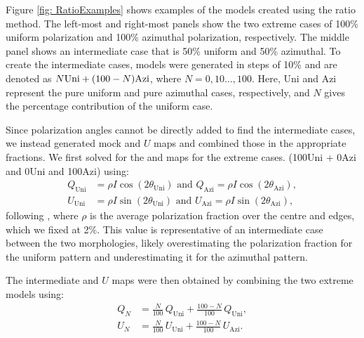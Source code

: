 Figure \ref{fig: RatioExamples} shows examples of the models created using the ratio method.  The left-most and right-most panels show the two extreme cases of 100\% uniform polarization and 100\% azimuthal polarization, respectively.  The middle panel shows an intermediate case that is 50\% uniform and 50\% azimuthal.  To create the intermediate cases, models were generated in steps of 10\% and are denoted as $N \text{Uni} + (100 - N) \text{Azi}$, where $N = 0, 10 \ldots, 100$. Here, Uni and Azi represent the pure uniform and pure azimuthal cases, respectively, and $N$ gives the percentage contribution of the uniform case. 





Since polarization angles cannot be directly added to find the intermediate cases, we instead generated mock \SQ and $U$ maps and combined those in the appropriate fractions.  We first solved for the \SQ and \SQ maps for the extreme cases. (100Uni + 0Azi and 0Uni and 100Azi) using:
\begin{equation}
\begin{aligned}
Q_{\text{Uni}} &= \rho I \cos(2\theta_{\text{Uni}}) \text{ and }
Q_\text{Azi} = \rho I \cos(2\theta_\text{Azi}),
     \\
U_{\text{Uni}} &=  \rho I \sin(2\theta_{\text{Uni}}) \text{ and }
U_\text{Azi} =  \rho I \sin(2\theta_\text{Azi}),
\end{aligned}
\end{equation}
\noindent following \cite{Montier}, where $\rho$ is the average polarization fraction over the centre and edges, which we fixed at 2\%. This value is representative of an intermediate case between the two morphologies, likely overestimating the polarization fraction for the uniform pattern and underestimating it for the azimuthal pattern. 





The intermediate \SQ and $U$ maps were then obtained by combining the two extreme models using:
\begin{equation}
\begin{aligned}
Q_{N}
    &= \frac{N}{100}\,Q_{\text{Uni}}
     + \frac{100 -N}{100}\,Q_{\text{Uni}}, \\
U_{N}
    &= \frac{N}{100}\,U_{\text{Uni}}
     + \frac{100 -N}{100}\,U_{\text{Azi}}.
\end{aligned}
\end{equation}

